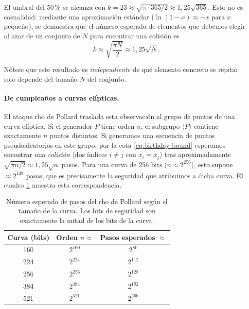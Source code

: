 El umbral del 50\,\% se alcanza con $k = 23 \approx \sqrt{\pi \cdot 365 / 2} \approx 1{,}25\sqrt{365}$. Esto no es casualidad: mediante una aproximación estándar ($\ln(1-x) \approx -x$ para $x$ pequeño), se demuestra que el número esperado de elementos que debemos elegir al azar de un conjunto de $N$ para encontrar una colisión es
\begin{equation}
\label{eq:birthday-bound}
    k \approx \sqrt{\frac{\pi N}{2}} \approx 1{,}25 \sqrt{N}.
\end{equation}

Nótese que este resultado es \emph{independiente} de qué elemento concreto se repita: solo depende del tamaño $N$ del conjunto.


\paragraph{De cumpleaños a curvas elípticas.}
El ataque rho de Pollard traslada esta observación al grupo de puntos de una curva elíptica. Si el generador $P$ tiene orden $n$, el subgrupo $\langle P \rangle$ contiene exactamente $n$ puntos distintos. Si generamos una secuencia de puntos pseudoaleatorios en este grupo, por la cota \eqref{eq:birthday-bound} esperamos encontrar una \emph{colisión} (dos índices $i \neq j$ con $x_i = x_j$) tras aproximadamente $\sqrt{\pi n/2} \approx 1{,}25\sqrt{n}$ pasos. Para una curva de 256 bits ($n \approx 2^{256}$), esto supone $\approx 2^{128}$ pasos, que es precisamente la seguridad que atribuimos a dicha curva. El cuadro \ref{tab:birthday-ecc} muestra esta correspondencia.

\begin{table}[htbp]
\centering
\begin{tabular}{ccc}
\hline
\textbf{Curva (bits)} & \textbf{Orden $n \approx$} & \textbf{Pasos esperados $\approx$} \\
\hline
160 & $2^{160}$ & $2^{80}$ \\
224 & $2^{224}$ & $2^{112}$ \\
256 & $2^{256}$ & $2^{128}$ \\
384 & $2^{384}$ & $2^{192}$ \\
521 & $2^{521}$ & $2^{260}$ \\
\hline
\end{tabular}
\caption{Número esperado de pasos del rho de Pollard según el tamaño de la curva. Los bits de seguridad son exactamente la mitad de los bits de la curva.}
\label{tab:birthday-ecc}
\end{table}

